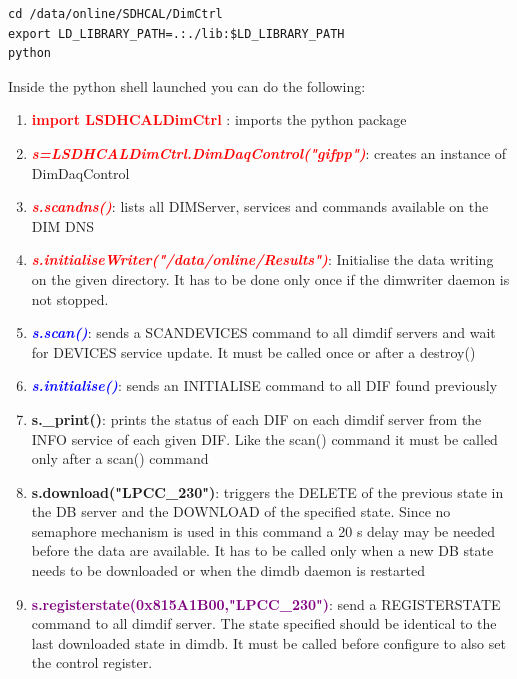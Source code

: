 \documentclass[english]{article}
\begin{document}
\begin{verbatim}
cd /data/online/SDHCAL/DimCtrl
export LD_LIBRARY_PATH=.:./lib:$LD_LIBRARY_PATH
python
\end{verbatim}  

Inside the python shell launched you can do the following:

\begin{enumerate} 
\item \textcolor{red}{ \bf  import LSDHCALDimCtrl} :  imports the python package

\item \textcolor{red}{\it \bf s=LSDHCALDimCtrl.DimDaqControl("gifpp")}:  creates an instance of DimDaqControl

\item \textcolor{red}{\it \bf s.scandns()}: lists all DIMServer, services and commands available on the DIM DNS  
\item \textcolor{red}{\it \bf s.initialiseWriter("/data/online/Results")}: Initialise the data writing on the given directory. It has to be done only once if the dimwriter daemon is not stopped.

\item \textcolor{blue}{\it \bf s.scan()}: sends a SCANDEVICES command to all dimdif servers and wait for DEVICES service update. It must be called once or after a destroy()


\item \textcolor{blue}{\it {\bf s.initialise()}}: sends an INITIALISE command to all DIF found previously
\item {\bf s.\_print()}: prints the status of each DIF on each dimdif server from the INFO service of each given DIF. Like the scan() command it must be called only after a scan() command

\item {\bf s.download("LPCC\_230")}: triggers the DELETE of the previous state in the DB server and the DOWNLOAD of the specified state. Since no semaphore mechanism is used in this command a 20 s delay may be needed before the data are available. It has to be called only when a new DB state needs to be downloaded or when the dimdb daemon is restarted

\item \textcolor{purple}{\bf s.registerstate(0x815A1B00,"LPCC\_230")}: send a REGISTERSTATE command to all dimdif server. The state specified should be identical to the last downloaded state in dimdb. It must be called before configure to also set the control register.


\end{enumerate}
\end{document}

